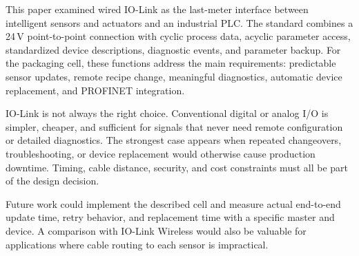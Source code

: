 \documentclass[conference]{IEEEtran}
\begin{document}
This paper examined wired IO-Link as the last-meter interface between
intelligent sensors and actuators and an industrial PLC. The standard
combines a 24\,V point-to-point connection with cyclic process data,
acyclic parameter access, standardized device descriptions, diagnostic
events, and parameter backup. For the packaging cell, these functions
address the main requirements: predictable sensor updates, remote
recipe change, meaningful diagnostics, automatic device replacement,
and PROFINET integration.

IO-Link is not always the right choice. Conventional digital or analog
I/O is simpler, cheaper, and sufficient for signals that never need
remote configuration or detailed diagnostics. The strongest case
appears when repeated changeovers, troubleshooting, or device
replacement would otherwise cause production downtime. Timing, cable
distance, security, and cost constraints must all be part of the design
decision.

Future work could implement the described cell and measure actual
end-to-end update time, retry behavior, and replacement time with a
specific master and device. A comparison with IO-Link Wireless would
also be valuable for applications where cable routing to each sensor is
impractical.
\end{document}
